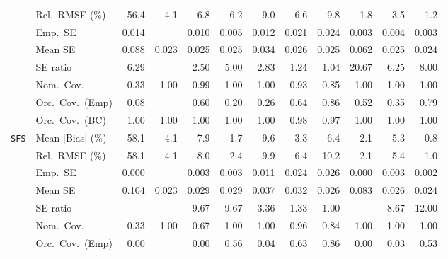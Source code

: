 \begin{landscape}
\begin{longtable}{llrrrrrrrrrr}
 & Rel.\ RMSE (\%) & 56.4 & 4.1 & 6.8 & 6.2 & 9.0 & 6.6 & 9.8 & \cellcolor{ranktwo}1.8 & \cellcolor{rankthree}3.5 & \cellcolor{rankone}1.2 \\
 & Emp.\ SE & 0.014 &  & 0.010 & 0.005 & 0.012 & 0.021 & 0.024 & 0.003 & 0.004 & 0.003 \\
 & Mean SE & 0.088 & 0.023 & 0.025 & 0.025 & 0.034 & 0.026 & 0.025 & 0.062 & 0.025 & 0.024 \\
 & SE ratio & 6.29 &  & \cellcolor{rankthree}2.50 & 5.00 & 2.83 & \cellcolor{ranktwo}1.24 & \cellcolor{rankone}1.04 & 20.67 & 6.25 & 8.00 \\
 & Nom.\ Cov. & 0.33 & \cellcolor{rankthree}1.00 & \cellcolor{ranktwo}0.99 & \cellcolor{rankthree}1.00 & \cellcolor{rankthree}1.00 & \cellcolor{rankone}0.93 & 0.85 & \cellcolor{rankthree}1.00 & \cellcolor{rankthree}1.00 & \cellcolor{rankthree}1.00 \\
 & Orc.\ Cov.\ (Emp) & 0.08 &  & 0.60 & 0.20 & 0.26 & \cellcolor{rankthree}0.64 & \cellcolor{rankone}0.86 & 0.52 & 0.35 & \cellcolor{ranktwo}0.79 \\
 & Orc.\ Cov.\ (BC) & \cellcolor{rankthree}1.00 & \cellcolor{rankthree}1.00 & \cellcolor{rankthree}1.00 & \cellcolor{rankthree}1.00 & \cellcolor{rankthree}1.00 & \cellcolor{ranktwo}0.98 & \cellcolor{rankone}0.97 & \cellcolor{rankthree}1.00 & \cellcolor{rankthree}1.00 & \cellcolor{rankthree}1.00 \\
\addlinespace[2pt]
\quad \texttt{SFS} & Mean $|$Bias$|$ (\%) & 58.1 & 4.1 & 7.9 & \cellcolor{ranktwo}1.7 & 9.6 & 3.3 & 6.4 & \cellcolor{rankthree}2.1 & 5.3 & \cellcolor{rankone}0.8 \\
 & Rel.\ RMSE (\%) & 58.1 & 4.1 & 8.0 & \cellcolor{rankthree}2.4 & 9.9 & 6.4 & 10.2 & \cellcolor{ranktwo}2.1 & 5.4 & \cellcolor{rankone}1.0 \\
 & Emp.\ SE & 0.000 &  & 0.003 & 0.003 & 0.011 & 0.024 & 0.026 & 0.000 & 0.003 & 0.002 \\
 & Mean SE & 0.104 & 0.023 & 0.029 & 0.029 & 0.037 & 0.032 & 0.026 & 0.083 & 0.026 & 0.024 \\
 & SE ratio &  &  & 9.67 & 9.67 & \cellcolor{rankthree}3.36 & \cellcolor{ranktwo}1.33 & \cellcolor{rankone}1.00 &  & 8.67 & 12.00 \\
 & Nom.\ Cov. & 0.33 & \cellcolor{ranktwo}1.00 & 0.67 & \cellcolor{ranktwo}1.00 & \cellcolor{ranktwo}1.00 & \cellcolor{rankone}0.96 & \cellcolor{rankthree}0.84 & \cellcolor{ranktwo}1.00 & \cellcolor{ranktwo}1.00 & \cellcolor{ranktwo}1.00 \\
 & Orc.\ Cov.\ (Emp) & 0.00 &  & 0.00 & \cellcolor{rankthree}0.56 & 0.04 & \cellcolor{ranktwo}0.63 & \cellcolor{rankone}0.86 & 0.00 & 0.03 & 0.53 \\

\end{longtable}
\end{landscape}

